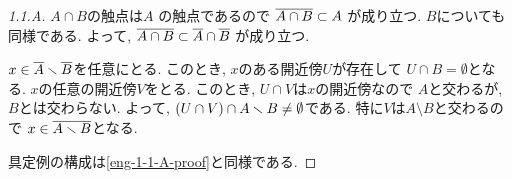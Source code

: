 \documentclass[uplatex, dvipdfmx, a4paper, 12pt, class=jsarticle, crop=false]{standalone}
\begin{document}
\begin{proof}[1.1.A]\label{eng-1-1-A-proof}
	\(A \cap B\)の触点は\(A\)
	の触点であるので
	\(\overline{A \cap B} \subset A\)
	が成り立つ.
	\(B\)についても同様である.
	よって, \(\overline{A \cap B} \subset
	\overline{A} \cap \overline{B}\)
	が成り立つ.

	\(x \in \overline{A} \smallsetminus
	\overline{B}\)を任意にとる.
	このとき, \(x\)のある開近傍\(U\)が存在して
	\(U \cap B = \emptyset\)となる.
	\(x\)の任意の開近傍\(V\)をとる.
	このとき, \(U \cap V\)は\(x\)の開近傍なので
	\(A\)と交わるが, \(B\)とは交わらない.
	よって, \(\lrparen{U \cap V} \cap A
	\setminus B \neq \emptyset\)である.
	特に\(V\)は\(A \setminus B\)と交わるので
	\(x \in \overline{A \smallsetminus B}\)となる.

	具定例の構成は\ref{eng-1-1-A-proof}と同様である.
\end{proof}
\end{document}
